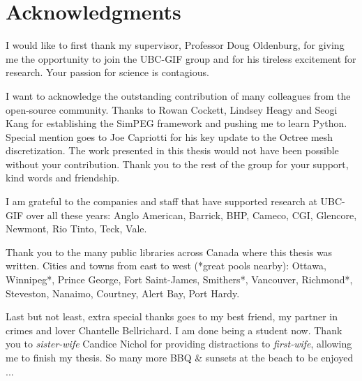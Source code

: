 
\chapter{Acknowledgments}
I would like to first thank my supervisor, Professor Doug Oldenburg, for giving me the opportunity to join the UBC-GIF group and for his tireless excitement for research. Your passion for science is contagious.

I want to acknowledge the outstanding contribution of many colleagues from the open-source community. Thanks to Rowan Cockett, Lindsey Heagy and Seogi Kang for establishing the SimPEG framework and pushing me to learn Python. Special mention goes to Joe Capriotti for his key update to the Octree mesh discretization. The work presented in this thesis would not have been possible without your contribution. Thank you to the rest of the group for your support, kind words and friendship.

I am grateful to the companies and staff that have supported research at UBC-GIF over all these years: Anglo American, Barrick, BHP, Cameco, CGI, Glencore, Newmont, Rio Tinto, Teck, Vale.

Thank you to the many public libraries across Canada where this thesis was written. Cities and towns from east to west (*great pools nearby):
Ottawa, Winnipeg*, Prince George, Fort Saint-James, Smithers*, Vancouver, Richmond*, Steveston, Nanaimo, Courtney, Alert Bay, Port Hardy.

Last but not least, extra special thanks goes to my best friend, my partner in crimes and lover Chantelle Bellrichard. I am done being a student now. Thank you to \emph{sister-wife} Candice Nichol for providing distractions to \emph{first-wife}, allowing me to finish my thesis. So many more BBQ \& sunsets at the beach to be enjoyed ...


